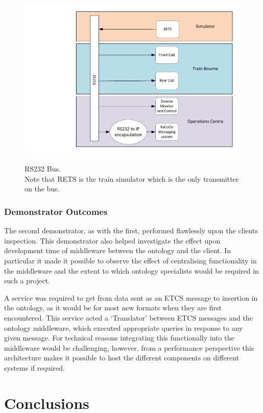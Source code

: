 \begin{figure}[h]
\myfloatalign
{\includegraphics[width=\linewidth]{gfx/RS232Bus}} 
\caption[Demonstator Two - RS232 Bus]{RS232 Bus. \\ Note that RETS is the train simulator which is the only transmitter on the bus.}
\label{fig:RS232}
\end{figure}

\subsubsection{Demonstrator Outcomes}
The second demonstrator, as with the first, performed flawlessly upon the clients inspection. This demonstrator also helped investigate the effect upon development time of middleware between the ontology and the client. In particular it made it possible to observe the effect of centralising functionality in the middleware and the extent to which ontology specialists would be required in such a project. 

A service was required to get from data sent as an ETCS message to insertion in the ontology, as it would be for most new formats when they are first encountered. This service acted a `Translator' between ETCS messages and the ontology middleware, which executed appropriate queries in response to any given message. For technical reasons integrating this functionally into the middleware would be challenging, however, from a performance perspective this architecture makes it possible to host the different components on different systems if required. 

\section{Conclusions}

